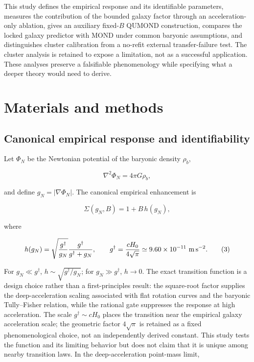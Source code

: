 \documentclass[utf8]{FrontiersinHarvard}
\begin{document}
This study defines the empirical response and its identifiable parameters, measures the contribution of the bounded galaxy factor through an acceleration-only ablation, gives an auxiliary fixed-\(B\) QUMOND construction, compares the locked galaxy predictor with MOND under common baryonic assumptions, and distinguishes cluster calibration from a no-refit external transfer-failure test. The cluster analysis is retained to expose a limitation, not as a successful application. These analyses preserve a falsifiable phenomenology while specifying what a deeper theory would need to derive.

\section{Materials and methods}\label{materials-and-methods}

\subsection{Canonical empirical response and identifiability}\label{canonical-empirical-response-and-identifiability}

Let \(\Phi_N\) be the Newtonian potential of the baryonic density \(\rho_b\),

\[
\nabla^2\Phi_N=4\pi G\rho_b,
\tag{1}
\]

and define \(g_N=|\nabla\Phi_N|\). The canonical empirical enhancement is

\[
\Sigma(g_N,B)=1+B\,h(g_N),
\tag{2}
\]

where

\[
h(g_N)=\sqrt{\frac{g^\dagger}{g_N}}
\frac{g^\dagger}{g^\dagger+g_N},
\qquad
g^\dagger=\frac{cH_0}{4\sqrt{\pi}}
\simeq9.60\times10^{-11}\ {\rm m\,s^{-2}} .
\tag{3}
\]

For \(g_N\ll g^\dagger\), \(h\sim\sqrt{g^\dagger/g_N}\); for \(g_N\gg g^\dagger\), \(h\rightarrow0\). The exact transition function is a design choice rather than a first-principles result: the square-root factor supplies the deep-acceleration scaling associated with flat rotation curves and the baryonic Tully--Fisher relation, while the rational gate suppresses the response at high acceleration. The scale \(g^\dagger\sim cH_0\) places the transition near the empirical galaxy acceleration scale; the geometric factor \(4\sqrt{\pi}\) is retained as a fixed phenomenological choice, not an independently derived constant. This study tests the function and its limiting behavior but does not claim that it is unique among nearby transition laws. In the deep-acceleration point-mass limit,
\end{document}
